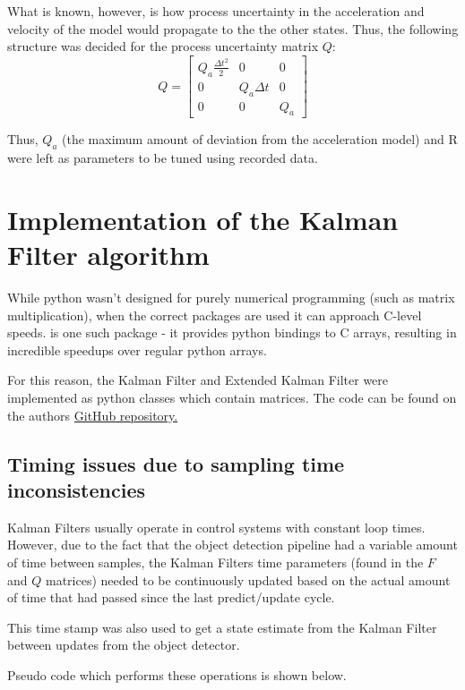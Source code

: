 What is known, however, is how process uncertainty in the acceleration and velocity of the model would propagate to the the other states. Thus, the following structure was decided for the process uncertainty matrix $Q$:
\[ Q = \begin{bmatrix}
	Q_a \frac{\Delta t^2}{2} & 0 & 0 \\
	0 & Q_a \Delta t & 0 \\
	0 & 0 & Q_a \end{bmatrix} \]

Thus, $Q_a$ (the maximum amount of deviation from the acceleration model) and R were left as parameters to be tuned using recorded data.

\section{Implementation of the Kalman Filter algorithm}

While python wasn't designed for purely numerical programming (such as matrix multiplication), when the correct packages are used it can approach C-level speeds.  is one such package - it provides python bindings to C arrays, resulting in incredible speedups over regular python arrays.

For this reason, the Kalman Filter and Extended Kalman Filter were implemented as python classes which contain  matrices. The code can be found on the authors \href{https://github.com/alknemeyer/EEE4022S-Thesis-Project/blob/master/Final%20code/extended_kalman_filter.ipynb}{GitHub repository.}

\subsection{Timing issues due to sampling time inconsistencies}
Kalman Filters usually operate in control systems with constant loop times. However, due to the fact that the object detection pipeline had a variable amount of time between samples, the Kalman Filters time parameters (found in the $F$ and $Q$ matrices) needed to be continuously updated based on the actual amount of time that had passed since the last predict/update cycle.

This time stamp was also used to get a state estimate from the Kalman Filter between updates from the object detector.

Pseudo code which performs these operations is shown below.\\

